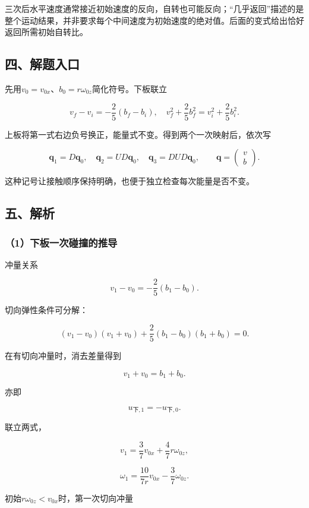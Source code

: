 \documentclass[12pt,a4paper,fontset=fandol]{ctexart}
\begin{document}
三次后水平速度通常接近初始速度的反向，自转也可能反向；``几乎返回''描述的是整个运动结果，并非要求每个中间速度为初始速度的绝对值。后面的变式给出恰好返回所需初始自转比。

\subsection{四、解题入口}\label{ux56dbux89e3ux9898ux5165ux53e3-2}

先用\(v_0=v_{0x}\)、\(b_0=r\omega_{0z}\)简化符号。下板联立

\[
v_f-v_i=-\frac25(b_f-b_i),\quad
v_f^2+\frac25b_f^2=v_i^2+\frac25b_i^2.
\]

上板将第一式右边负号换正，能量式不变。得到两个一次映射后，依次写

\[
\boldsymbol q_1=D\boldsymbol q_0,\quad
\boldsymbol q_2=UD\boldsymbol q_0,\quad
\boldsymbol q_3=DUD\boldsymbol q_0,
\qquad
\boldsymbol q=\begin{pmatrix}v\\b\end{pmatrix}.
\]

这种记号让接触顺序保持明确，也便于独立检查每次能量是否不变。

\subsection{五、解析}\label{ux4e94ux89e3ux6790-2}

\subsubsection{（1）下板一次碰撞的推导}\label{ux4e0bux677fux4e00ux6b21ux78b0ux649eux7684ux63a8ux5bfc}

冲量关系

\[
v_1-v_0=-\frac25(b_1-b_0).
\]

切向弹性条件可分解：

\[
(v_1-v_0)(v_1+v_0)
+\frac25(b_1-b_0)(b_1+b_0)=0.
\]

在有切向冲量时，消去差量得到

\[
v_1+v_0=b_1+b_0.
\]

亦即

\[
u_{{\text{下}},1}=-u_{{\text{下}},0}.
\]

联立两式，

\[
\boxed{v_1=\frac37v_{0x}+\frac47r\omega_{0z}},
\]

\[
\boxed{\omega_1=\frac{10}{7r}v_{0x}-\frac37\omega_{0z}}.
\]

初始\(r\omega_{0z}<v_{0x}\)时，第一次切向冲量
\end{document}
